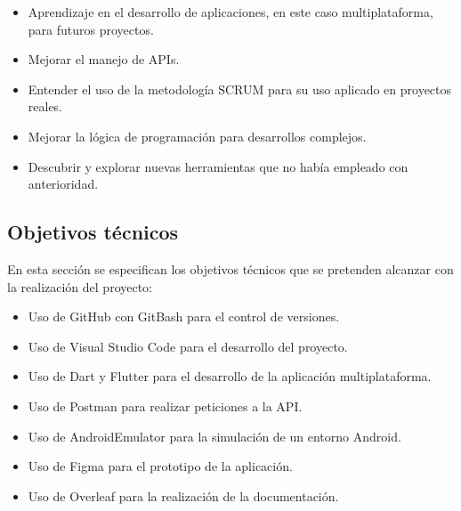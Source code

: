 \begin{itemize}
    \item Aprendizaje en el desarrollo de aplicaciones, en este caso multiplataforma, para futuros proyectos.
    \item Mejorar el manejo de APIs.
    \item Entender el uso de la metodología SCRUM para su uso aplicado en proyectos reales.
    \item Mejorar la lógica de programación para desarrollos complejos.
    \item Descubrir y explorar nuevas herramientas que no había empleado con anterioridad.
\end{itemize}

\subsection{Objetivos técnicos}
En esta sección se especifican los objetivos técnicos que se pretenden alcanzar con la realización del proyecto:

\begin{itemize}
    \item Uso de GitHub con GitBash para el control de versiones.
    \item Uso de Visual Studio Code para el desarrollo del proyecto.
    \item Uso de Dart y Flutter para el desarrollo de la aplicación multiplataforma.
    \item Uso de Postman para realizar peticiones a la API.
    \item Uso de AndroidEmulator para la simulación de un entorno Android.
    \item Uso de Figma para el prototipo de la aplicación.
    \item Uso de Overleaf para la realización de la documentación.
\end{itemize}